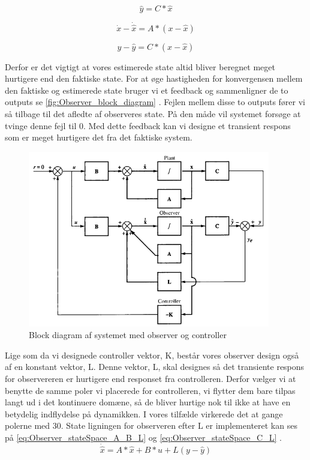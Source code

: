 \begin{equation}
\hat{y} = C * \hat{x}
\label{eq:Observer_stateSpace_C}
\end{equation}

\begin{equation}
\dot{x} - \dot{\hat{x}} = A * (x -\hat{x})
\label{eq:Subtraktion_A}
\end{equation}

\begin{equation}
y -\hat{y} = C * (x - \hat{x})
\label{eq:Subtraktion_C}
\end{equation}

Derfor er det vigtigt at vores estimerede state altid bliver beregnet meget hurtigere end den faktiske state. For at øge hastigheden for konvergensen mellem den faktiske og estimerede state bruger vi et feedback og sammenligner de to outputs se \autoref{fig:Observer_block_diagram} . Fejlen mellem disse to outputs fører vi så tilbage til det afledte af observeres state. På den måde vil systemet forsøge at tvinge denne fejl til 0. Med dette feedback kan vi designe et transient respons som er meget hurtigere det fra det faktiske system. 

\begin{figure}[H]
	\centering
	\includegraphics[width = 300pt]{Img/Observer_block_diagram.png}
	\caption{Block diagram af systemet med observer og controller}
	\label{fig:Observer_block_diagram}
\end{figure}

Lige som da vi designede controller vektor, K, består vores observer design også af en konstant vektor, L. Denne vektor, L, skal designes så det transiente respons for observereren er hurtigere end responset fra controlleren. Derfor vælger vi at benytte de samme poler vi placerede for controlleren, vi flytter dem bare tilpas langt ud i det kontinuere domæne, så de bliver hurtige nok til ikke at have en betydelig indflydelse på dynamikken. I vores tilfælde virkerede det at gange polerne med 30. State ligningen for observeren efter L er implementeret kan ses på \autoref{eq:Observer_stateSpace_A_B_L} og \autoref{eq:Observer_stateSpace_C_L} . 
\begin{equation}
\dot{\hat{x}} = A * \hat{x} + B * u + L(y - \hat{y})
\label{eq:Observer_stateSpace_A_B_L}
\end{equation}

